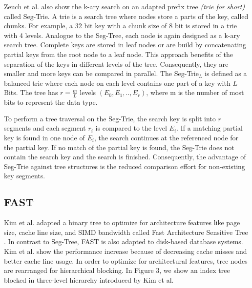 \documentclass[conference]{IEEEtran}
\begin{document}
Zeuch et al. also show the k-ary search on an adapted prefix tree \emph{(trie for short)} called Seg-Trie. A trie is a search tree where nodes store a parts of the key, called chunks. For example, a 32 bit key with a chunk size of 8 bit is stored in a trie with 4 levels. Analogue to the Seg-Tree, each node is again designed as a k-ary search tree. Complete keys are stored in leaf nodes or are build by concatenating partial keys from the root node to a leaf node. This approach benefits of the separation of the keys in different levels of the tree. Consequently, they are smaller and more keys can be compared in parallel. The Seg-Trie$_L$ is defined as a balanced trie where each node on each level contains one part of a key with $L$ Bits. The tree has $r = \frac{m}{L}$ levels $(E_0, E_1, .., E_r)$, where m is the number of most bits to represent the data type.

To perform a tree traversal on the Seg-Trie, the search key is split into $r$ segments and each segment $r_i$ is compared to the level $E_i$. If a matching partial key is found in one node of $E_i$, the search continues at the referenced node for the partial key. If no match of the partial key is found, the Seg-Trie does not contain the search key and the search is finished. Consequently, the advantage of Seg-Trie against tree structures is the reduced comparison effort for non-existing key segments. 


\subsection{FAST}\label{SCM}
Kim et al. adapted a binary tree to optimize for architecture features like page size, cache line size, and SIMD bandwidth called Fast Architecture Sensitive Tree \cite{b6}. In contrast to Seg-Tree, FAST is also adapted to disk-based database systems. Kim et al. show the performance increase because of decreasing cache misses and better cache line usage. In order to optimize for architectural features, tree nodes are rearranged for hierarchical blocking. In Figure 3, we show an index tree blocked in three-level hierarchy introduced by Kim et al. 
\end{document}
